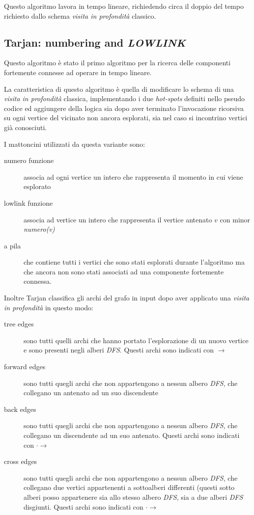 Questo algoritmo lavora in tempo lineare, richiedendo circa il doppio
del tempo richiesto dallo schema \emph{visita in profondit\`a} classico.

\subsection{Tarjan: numbering and \emph{LOWLINK}}
\label{subsection:tarjan-algorithm}
Questo algoritmo \`e stato il primo algoritmo per la ricerca delle
componenti fortemente connesse ad operare in tempo lineare.

La caratteristica di questo algoritmo \`e quella di modificare lo
schema di una \emph{visita in profondit\`a} classica, implementando i due
\emph{hot-spots} definiti nello pseudo codice ed aggiungere della
logica sia dopo aver terminato l'invocazione ricorsiva su ogni vertice
del vicinato non ancora esplorati, sia nel caso si incontrino vertici
gi\`a conosciuti.

I mattoncini utilizzati da questa variante sono:
\begin{description}
\item[numero funzione] associa ad ogni vertice un intero che
  rappresenta il momento in cui viene esplorato
\item[lowlink funzione] associa ad vertice un intero che rappresenta
  il vertice antenato $v$ con minor \emph{numero(v)}
\item[a pila] che contiene tutti i vertici che sono stati esplorati
  durante l'algoritmo ma che ancora non sono stati associati ad una
  componente fortemente connessa.
\end{description}

Inoltre Tarjan classifica gli archi del grafo in input dopo aver
applicato una \emph{visita in profondit\`a} in questo modo: 
\begin{description}
\item[tree edges] sono tutti quelli archi che hanno portato
  l'esplorazione di un nuovo vertice e sono presenti negli alberi
  \emph{DFS}. Questi archi sono indicati con $\rightarrow$
\item[forward edges] sono tutti quegli archi che non appartengono a
  nessun albero \emph{DFS}, che collegano un antenato ad un suo
  discendente
\item[back edges] sono tutti quegli archi che non appartengono a
  nessun albero \emph{DFS}, che collegano un discendente ad un suo
  antenato. Questi archi sono indicati con $\cdot\rightarrow$
\item[cross edges] sono tutti quegli archi che non appartengono a
  nessun albero \emph{DFS}, che collegano due vertici appartenenti a
  sottoalberi differenti (questi sotto alberi posso appartenere sia
  allo stesso albero \emph{DFS}, sia a due alberi \emph{DFS}
  disgiunti. Questi archi sono indicati con $\cdot\rightarrow$
\end{description}

